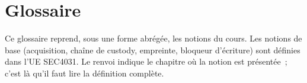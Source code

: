 
\chapter{Glossaire}
\label{ann:glossaire}

Ce glossaire reprend, sous une forme abrégée, les notions du cours. Les
notions de base (acquisition, chaîne de custody, empreinte, bloqueur
d'écriture) sont définies dans l'UE SEC4031. Le renvoi indique le chapitre
où la notion est présentée~; c'est là qu'il faut lire la définition complète.

